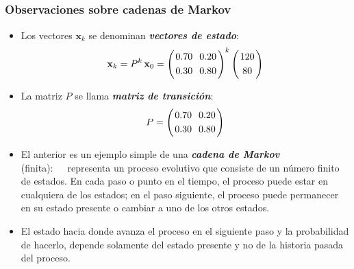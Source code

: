 
\subsection{}

{\nologo
\begin{frame}\frametitle{Observaciones sobre cadenas de Markov}
	
	\begin{itemize}\justifying 
		\item Los vectores $\mathbf{x}_k$ se denominan \textbf{\textit{vectores de estado}}:
		\[
		\mathbf{x}_k = P^k\, \mathbf{x}_0 =
		\left(
		\begin{array}{@{\hspace{0.2\tabcolsep}}c@{\hspace{1.2\tabcolsep}}c@{\hspace{0.2\tabcolsep}}}
		0.70 & 0.20 \\[1mm]
		0.30 & 0.80
		\end{array}
		\right)^k
		\left(
		\begin{array}{@{\hspace{0.2\tabcolsep}}c@{\hspace{0.2\tabcolsep}}}
		120 \\[1mm]
		80
		\end{array}
		\right)
		\]
		
		\vspace{1mm}
		\item La matriz $P$ se llama \textbf{\textit{matriz de transición}}:
		\[
		P =
		\left(
		\begin{array}{@{\hspace{0.2\tabcolsep}}c@{\hspace{1.2\tabcolsep}}c@{\hspace{0.2\tabcolsep}}}
		0.70 & 0.20 \\[1mm]
		0.30 & 0.80
		\end{array}
		\right)
		\]
		
		\vspace{1mm}
		\item El anterior es un ejemplo simple de una \textbf{\textit{cadena de Markov}} (finita):\ \ \  representa
		un proceso evolutivo que consiste de un número finito de estados. En cada paso o punto
		en el tiempo, el proceso puede estar en cualquiera de los estados; en el paso siguiente, el
		proceso puede permanecer en su estado presente o cambiar a uno de los otros estados.
		
		\vspace{2mm}
		\item El estado hacia donde avanza el proceso en el siguiente paso y la probabilidad de hacerlo,
		depende solamente del estado presente y no de la historia pasada del proceso.
		
	\end{itemize}
	
	
\end{frame}
}

